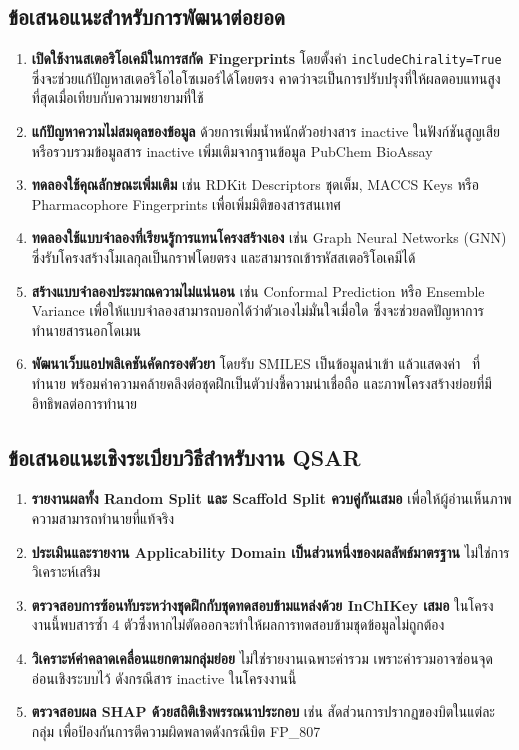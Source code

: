 \subsection{ข้อเสนอแนะสำหรับการพัฒนาต่อยอด}

\begin{enumerate}[leftmargin=2em, itemsep=0.4em]
  \item \textbf{เปิดใช้งานสเตอริโอเคมีในการสกัด Fingerprints} โดยตั้งค่า \texttt{includeChirality=True} ซึ่งจะช่วยแก้ปัญหาสเตอริโอไอโซเมอร์ได้โดยตรง คาดว่าจะเป็นการปรับปรุงที่ให้ผลตอบแทนสูงที่สุดเมื่อเทียบกับความพยายามที่ใช้
  \item \textbf{แก้ปัญหาความไม่สมดุลของข้อมูล} ด้วยการเพิ่มน้ำหนักตัวอย่างสาร inactive ในฟังก์ชันสูญเสีย หรือรวบรวมข้อมูลสาร inactive เพิ่มเติมจากฐานข้อมูล PubChem BioAssay
  \item \textbf{ทดลองใช้คุณลักษณะเพิ่มเติม} เช่น RDKit Descriptors ชุดเต็ม, MACCS Keys หรือ Pharmacophore Fingerprints เพื่อเพิ่มมิติของสารสนเทศ
  \item \textbf{ทดลองใช้แบบจำลองที่เรียนรู้การแทนโครงสร้างเอง} เช่น Graph Neural Networks (GNN) ซึ่งรับโครงสร้างโมเลกุลเป็นกราฟโดยตรง และสามารถเข้ารหัสสเตอริโอเคมีได้
  \item \textbf{สร้างแบบจำลองประมาณความไม่แน่นอน} เช่น Conformal Prediction หรือ Ensemble Variance เพื่อให้แบบจำลองสามารถบอกได้ว่าตัวเองไม่มั่นใจเมื่อใด ซึ่งจะช่วยลดปัญหาการทำนายสารนอกโดเมน
  \item \textbf{พัฒนาเว็บแอปพลิเคชันคัดกรองตัวยา} โดยรับ SMILES เป็นข้อมูลนำเข้า แล้วแสดงค่า \pICfifty\ ที่ทำนาย พร้อมค่าความคล้ายคลึงต่อชุดฝึกเป็นตัวบ่งชี้ความน่าเชื่อถือ และภาพโครงสร้างย่อยที่มีอิทธิพลต่อการทำนาย
\end{enumerate}

\subsection{ข้อเสนอแนะเชิงระเบียบวิธีสำหรับงาน QSAR}

\begin{enumerate}[leftmargin=2em, itemsep=0.4em]
  \item \textbf{รายงานผลทั้ง Random Split และ Scaffold Split ควบคู่กันเสมอ} เพื่อให้ผู้อ่านเห็นภาพความสามารถทำนายที่แท้จริง
  \item \textbf{ประเมินและรายงาน Applicability Domain เป็นส่วนหนึ่งของผลลัพธ์มาตรฐาน} ไม่ใช่การวิเคราะห์เสริม
  \item \textbf{ตรวจสอบการซ้อนทับระหว่างชุดฝึกกับชุดทดสอบข้ามแหล่งด้วย InChIKey เสมอ} ในโครงงานนี้พบสารซ้ำ 4 ตัวซึ่งหากไม่ตัดออกจะทำให้ผลการทดสอบข้ามชุดข้อมูลไม่ถูกต้อง
  \item \textbf{วิเคราะห์ค่าคลาดเคลื่อนแยกตามกลุ่มย่อย} ไม่ใช่รายงานเฉพาะค่ารวม เพราะค่ารวมอาจซ่อนจุดอ่อนเชิงระบบไว้ ดังกรณีสาร inactive ในโครงงานนี้
  \item \textbf{ตรวจสอบผล SHAP ด้วยสถิติเชิงพรรณนาประกอบ} เช่น สัดส่วนการปรากฏของบิตในแต่ละกลุ่ม เพื่อป้องกันการตีความผิดพลาดดังกรณีบิต FP\_807
\end{enumerate}
